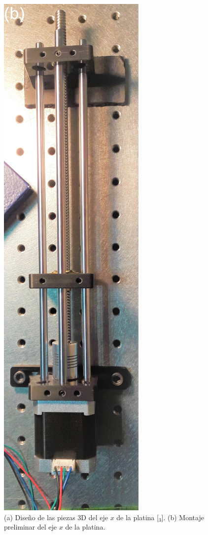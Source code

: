 \begin{figure}[H]
\includegraphics[scale=0.073]{Figs/microespectrometro/1ejemontado.jpg}
\hfill%
\hfill%
\caption{(a) Diseño de las piezas 3D del eje $\textit{x}$ de la platina [\href{https://github.com/jrr1984/open_frame_XYStage/blob/master/3dprintedparts/STLs/Ejexpreliminar.stl}{\faCubes$_{3}$}]. (b) Montaje preliminar del eje $\textit{x}$ de la platina.}
\label{fig:dis}
\end{figure}


